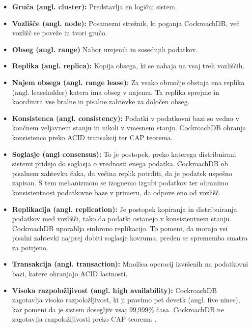 \documentclass[a4paper, 12pt]{book}
\begin{document}
\begin{itemize}
    \item \textbf{Gruča (angl. cluster):} Predstavlja en logični sistem. 
    \item \textbf{Vozlišče (angl. node):} Posamezni strežnik, ki poganja CockroachDB, več vozlišč se poveže in tvori gručo.
    \item \textbf{Obseg (angl. range)} Nabor urejenih in sosednjih podatkov.
    \item \textbf{Replika (angl. replica):} Kopija obsega, ki se nahaja na vsaj treh vozliščih.
    \item \textbf{Najem obsega (angl. range lease):} Za vsako območje obstaja ena replika (angl. leaseholder) katera ima obseg v najemu. Ta replika sprejme in koordinira vse bralne in pisalne zahtevke za določen obseg.
    \item \textbf{Konsistenca (angl. consistency):} Podatki v podatkovni bazi so vedno v končnem veljavnem stanju in nikoli v vmesnem stanju. CockroachDB ohranja konsistenco preko ACID transakcij ter CAP teorema.
    \item \textbf{Soglasje (angl consensus):} To je postopek, preko katerega distribuirani sistemi pridejo do soglasja o vrednosti enega podatka. CockroachDB ob pisalnem zahtevku čaka, da večina replik potrditi, da je podatek uspešno zapisan. S tem mehanizmom se izognemo izgubi podatkov ter ohranimo konsistentnost podatkovne baze v primeru, da odpove eno od vozlišč.
    \item \textbf{Replikacija (angl. replication):} Je postopek kopiranja in distribuiranja podatkov med vozlišči, tako da podatki ostanejo v konsistentnem stanju. CockroachDB uporablja sinhrono replikacijo. To pomeni, da morajo vsi pisalni zahtevki najprej dobiti soglasje kovruma, preden se sprememba smatra za potrjeno.
    \item \textbf{Transakcija (angl. transaction):} Množica operacij izvršenih na podatkovni bazi, katere ohranjajo ACID lastnosti.
    \item \textbf{Visoka razpoložljivost (angl. high availability):} CockroachDB zagotavlja visoko razpoložljivost, ki ji pravimo pet devetk (angl. five nines), kar pomeni da je sistem dosegljiv vsaj 99,999\% časa. CockroachDB ne zagotavlja razpoložljivosti preko CAP teorema \cite{CRDB-FAQ}.
\end{itemize}
\end{document}
